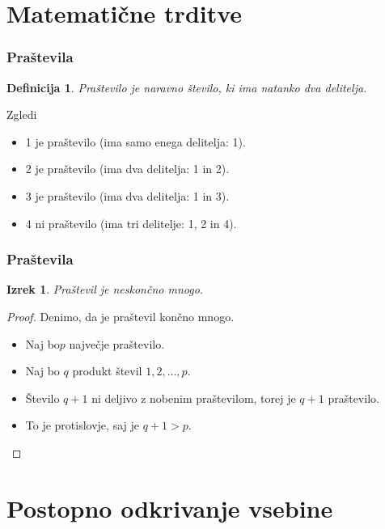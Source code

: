 \documentclass{beamer}
\newtheorem{definicija}{Definicija}
\newtheorem{izrek}{Izrek}
\begin{document}
\section{Matematične trditve}

\begin{frame}
\frametitle   {Praštevila}
     \begin{definicija}
        Praštevilo je naravno število, ki ima natanko dva delitelja.
     \end{definicija}
   \begin{exampleblock}{Zgledi}
      \begin{itemize}
\item         1 je praštevilo (ima samo enega delitelja: 1).
\item         2 je praštevilo (ima dva delitelja: 1 in 2).
\item         3 je praštevilo (ima dva delitelja: 1 in 3).
\item         4 ni praštevilo (ima tri delitelje: 1, 2 in 4).
\end{itemize}
\end{exampleblock}
\end{frame}
\begin{frame}
\frametitle   {Praštevila}
\begin{izrek}
      Praštevil je neskončno mnogo.
\end{izrek}
      \begin{proof}
Denimo, da je praštevil končno mnogo.
        \begin{itemize}
         \item Naj bo$ p$ največje praštevilo.
         \item Naj bo $q$ produkt števil $1, 2, \ldots, p.$
         \item Število $q+1$ ni deljivo z nobenim praštevilom, torej je $q+1$ praštevilo.
         \item To je protislovje, saj je $q+1>p.$
        \end{itemize}
      \end{proof}
\end{frame}

\section{Postopno odkrivanje vsebine}
\end{document}
